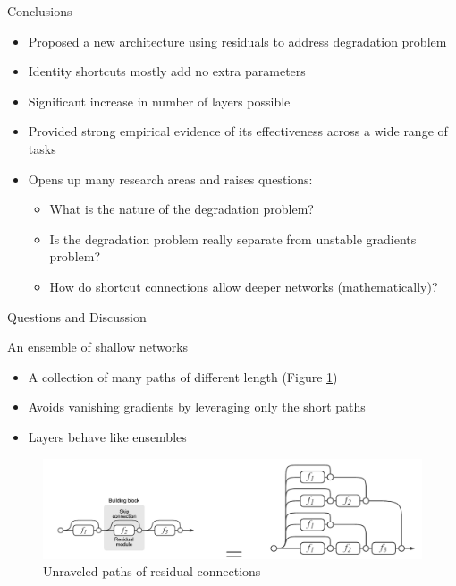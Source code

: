 \documentclass[10pt]{beamer}
\begin{document}
	\begin{frame}{Conclusions}
		\begin{itemize}
			\item Proposed a new architecture using residuals to address degradation problem
			\item Identity shortcuts mostly add no extra parameters
			\item Significant increase in number of layers possible
			\item Provided strong empirical evidence of its effectiveness across a wide range of tasks
			\item Opens up many research areas and raises questions:
				\begin{itemize}
					\item What is the nature of the degradation problem?
					\item Is the degradation problem really separate from unstable gradients problem?
					\item How do shortcut connections allow deeper networks (mathematically)?
				\end{itemize}  
		\end{itemize}
	\end{frame}

	\begin{frame}[standout]
		Questions and Discussion
	\end{frame}

\appendix

\begin{frame}{An ensemble of shallow networks \cite{resnet_as_ensemble_shallow_veit2016}}
	\begin{itemize}
		\item A collection of many paths of different length (Figure \ref{fig_multi_path})
		\item Avoids vanishing gradients by leveraging only the short paths
		\item Layers behave like ensembles
	\end{itemize}
	\begin{figure}
		\centering
		\includegraphics[width=\textwidth]{resnet_as_multiple_paths.png}
		\caption{Unraveled paths of residual connections}
		\label{fig_multi_path}
	  \end{figure}
\end{frame}
\end{document}
